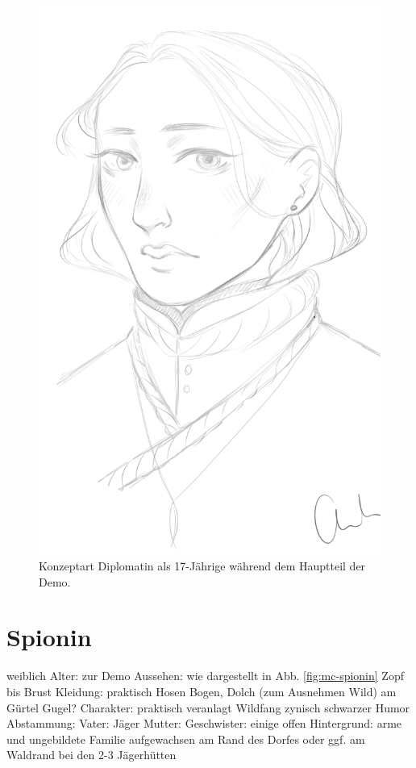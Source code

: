 \begin{figure}[tbh]
	\centering
	\includegraphics[width=0.325\textheight]{Abbildungen/Abenteuer/Hauptcharaktere/magierin}
	\caption[Konzeptart Diplomatin]{Konzeptart Diplomatin als 17-Jährige während dem Hauptteil der Demo.}
	\label{fig:mc-diplomatin}
\end{figure}


\section{Spionin} \label{sec:mc-spionin}
\begin{outline}
	\1 weiblich
	\1 Alter:
		 zur Demo
	\1 Aussehen:
		\2 wie dargestellt in Abb. \ref{fig:mc-spionin}
		\2 Zopf bis Brust
	\1 Kleidung:
		\2 praktisch
		\2 Hosen 
		\2 Bogen, Dolch (zum Ausnehmen Wild) am Gürtel
		\2 Gugel?
	\1 Charakter:
		\2 praktisch veranlagt
		\2 Wildfang 
		\2 zynisch 
		\2 schwarzer Humor
	\1 Abstammung:
		\2 Vater: Jäger
		\2 Mutter: 
		\2 Geschwister: einige offen
	\1 Hintergrund:
		\2 arme und ungebildete Familie
		\2 aufgewachsen am Rand des Dorfes oder ggf. am Waldrand bei den 2-3 Jägerhütten
\end{outline}

